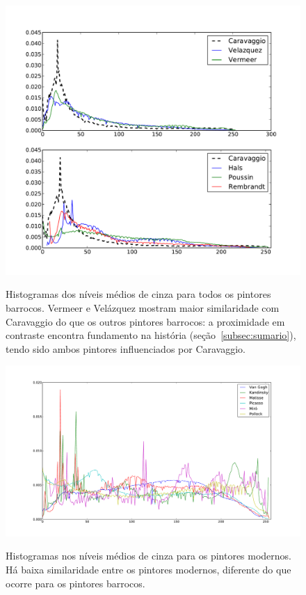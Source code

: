 \begin{figure}[h!]
\begin{center}
      \caption{Histogramas dos níveis médios de cinza para todos os
        pintores barrocos. Vermeer e Velázquez mostram maior
        similaridade com Caravaggio do que os outros pintores
        barrocos: a proximidade em contraste encontra fundamento na
        história (seção~\ref{subsec:sumario}), tendo sido ambos
        pintores influenciados por
        Caravaggio.}  \label{fig:chiaroscuro}
        { \centering \includegraphics[width=\columnwidth]{figs/chiaroscuro}} \fonteminha \end{center}
\end{figure}

\begin{figure}[h!]
    
\begin{center}
      \caption{Histogramas nos níveis médios de cinza para os pintores
        modernos. Há baixa similaridade entre os pintores modernos, diferente do
        que ocorre para os pintores barrocos.}
        \label{fig:chiaroscuro_modernos}
{    \centering
        \includegraphics[width=\columnwidth]{figs/chiaroscuro_modernos}}
      \fonteminha
  \end{center}
\end{figure}

